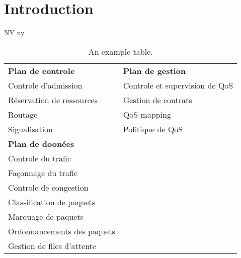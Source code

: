 \section{Introduction}
\ac{NY}
\ac{ny}













\begin{table}[h!]
\begin{center}
	\begin{tabulary}{\textwidth}{l|l}
	
	\textbf{Plan de controle}   & \textbf{Plan de gestion}      \\
	Controle d'admission        & Controle et supervision de QoS\\
	Réservation de ressources   & Gestion de contrats           \\
	Routage                     & QoS mapping                   \\
	Signalisation               & Politique de QoS              \\
	
	\textbf{Plan de doonées}    &                               \\
	Controle du trafic          &                               \\
	Façonnage du trafic         &                               \\
	Controle de congestion      &                               \\
	Classification de paquets   &                               \\
	Marquage de paquets         &                               \\
	Ordonnancements des paquets &                               \\
	Gestion de files d'attente  &                               \\

	\end{tabulary}
	\caption{\label{tab:qos} An example table.}
\end{center}
\end{table}
